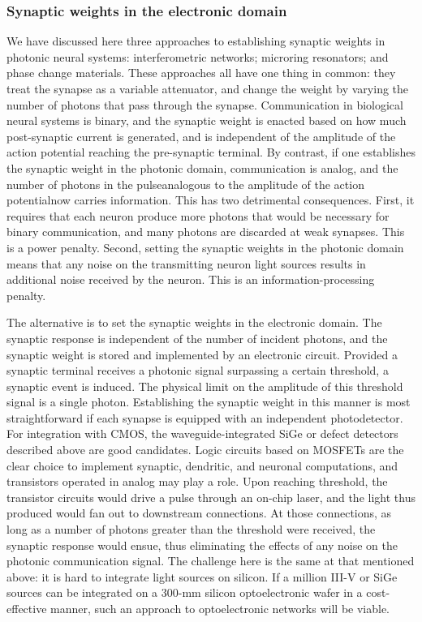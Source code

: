 \subsubsection{Synaptic weights in the electronic domain}
We have discussed here three approaches to establishing synaptic weights in photonic neural systems: interferometric networks; microring resonators; and phase change materials. These approaches all have one thing in common: they treat the synapse as a variable attenuator, and change the weight by varying the number of photons that pass through the synapse. Communication in biological neural systems is binary, and the synaptic weight is enacted based on how much post-synaptic current is generated, and is independent of the amplitude of the action potential reaching the pre-synaptic terminal. By contrast, if one establishes the synaptic weight in the photonic domain, communication is analog, and the number of photons in the pulse\textemdash analogous to the amplitude of the action potential\textemdash now carries information. This has two detrimental consequences. First, it requires that each neuron produce more photons that would be necessary for binary communication, and many photons are discarded at weak synapses. This is a power penalty. Second, setting the synaptic weights in the photonic domain means that any noise on the transmitting neuron light sources results in additional noise received by the neuron. This is an information-processing penalty.

The alternative is to set the synaptic weights in the electronic domain. The synaptic response is independent of the number of incident photons, and the synaptic weight is stored and implemented by an electronic circuit. Provided a synaptic terminal receives a photonic signal surpassing a certain threshold, a synaptic event is induced. The physical limit on the amplitude of this threshold signal is a single photon. Establishing the synaptic weight in this manner is most straightforward if each synapse is equipped with an independent photodetector. For integration with CMOS, the waveguide-integrated SiGe or defect detectors described above are good candidates. Logic circuits based on MOSFETs are the clear choice to implement synaptic, dendritic, and neuronal computations, and transistors operated in analog may play a role. Upon reaching threshold, the transistor circuits would drive a pulse through an on-chip laser, and the light thus produced would fan out to downstream connections. At those connections, as long as a number of photons greater than the threshold were received, the synaptic response would ensue, thus eliminating the effects of any noise on the photonic communication signal. The challenge here is the same at that mentioned above: it is hard to integrate light sources on silicon. If a million III-V or SiGe sources can be integrated on a 300-mm silicon optoelectronic wafer in a cost-effective manner, such an approach to optoelectronic networks will be viable.

